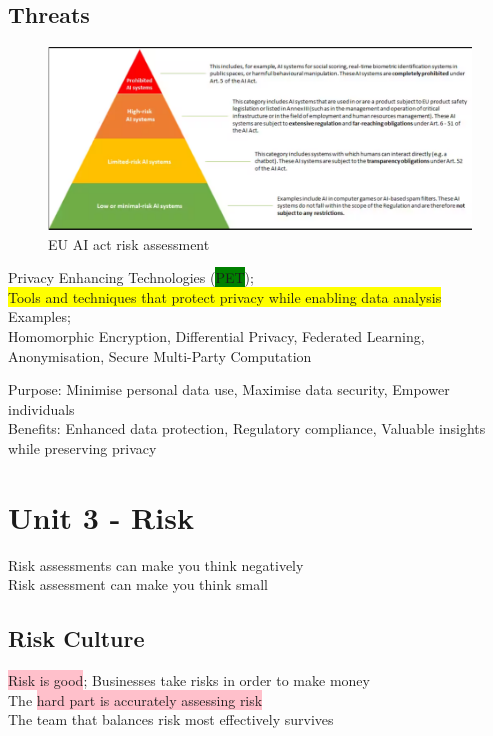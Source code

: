 \documentclass[tikz,border=10pt]{project_plan}
\begin{document}
\section{Threats}

\begin{figure}[H]
  \centering
  \includegraphics[width=\linewidth]{EU AI act risk assessment.png}
  \caption{EU AI act risk assessment}
\end{figure}

Privacy Enhancing Technologies (\colorbox{green}{PET});\\
\colorbox{yellow}{Tools and techniques that protect privacy while enabling data analysis}\\

Examples;\\
Homomorphic Encryption,
Differential Privacy,
Federated Learning,
Anonymisation,
Secure Multi-Party Computation

Purpose: Minimise personal data use, Maximise data security, Empower individuals\\
Benefits: Enhanced data protection, Regulatory compliance, Valuable insights while preserving privacy

\chapter{Unit 3 - Risk}

Risk assessments can make you think negatively \\
Risk assessment can make you think small

\section{Risk Culture}

\colorbox{pink}{Risk is good}; Businesses take risks in order to make money\\
The \colorbox{pink}{hard part is accurately assessing risk} \\
The team that balances risk most effectively survives
\end{document}
